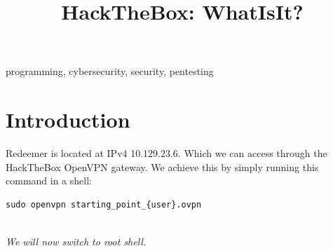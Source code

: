 \documentclass[conference]{IEEEtran}
\begin{document}
\onecolumn


\title{HackTheBox: WhatIsIt?}

\author{
}

\maketitle



\begin{abstract}

\end{abstract}



\begin{IEEEkeywords}
programming, cybersecurity, security, pentesting
\end{IEEEkeywords}


\section{Introduction}
Redeemer is located at IPv4 10.129.23.6. Which we can access through the HackTheBox OpenVPN gateway.
We achieve this by simply running this command in a shell:
\begin{scriptsize}
\begin{verbatim}
sudo openvpn starting_point_{user}.ovpn
\end{verbatim}
\end{scriptsize}

\\
\textit{We will now switch to root shell.}
\\
\end{document}
